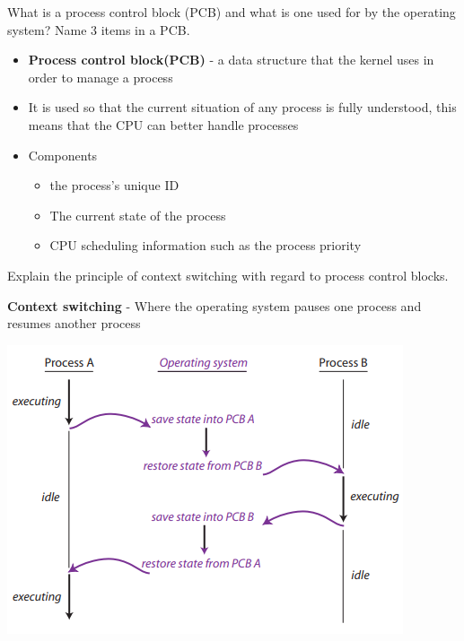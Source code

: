 \documentclass[addpoints]{exam}
\begin{document}
\begin{questions}
\question[6]What is a process control block (PCB) and what is one used for by the operating system? Name 3 items in a PCB.
\begin{solution}[2in]
	\begin{itemize}
		\item \textbf{Process control block(PCB)} - a data structure that the kernel uses in order to manage a process
		\item It is used so that the current situation of any process is fully understood, this means that the CPU can better handle processes
		\item Components
		\begin{itemize}
			\item the process's unique ID
			\item The current state of the process
			\item CPU scheduling information such as the process priority
		\end{itemize}
	\end{itemize}
\end{solution}

\question[5]Explain the principle of context switching with regard to process control blocks.
\begin{solution}[2in]
	\textbf{Context switching} - Where the operating system pauses one process and resumes another process
	\begin{center}
		\includegraphics[scale=0.7]{context_switching}
	\end{center}
\end{solution}


\end{questions}
\end{document}
